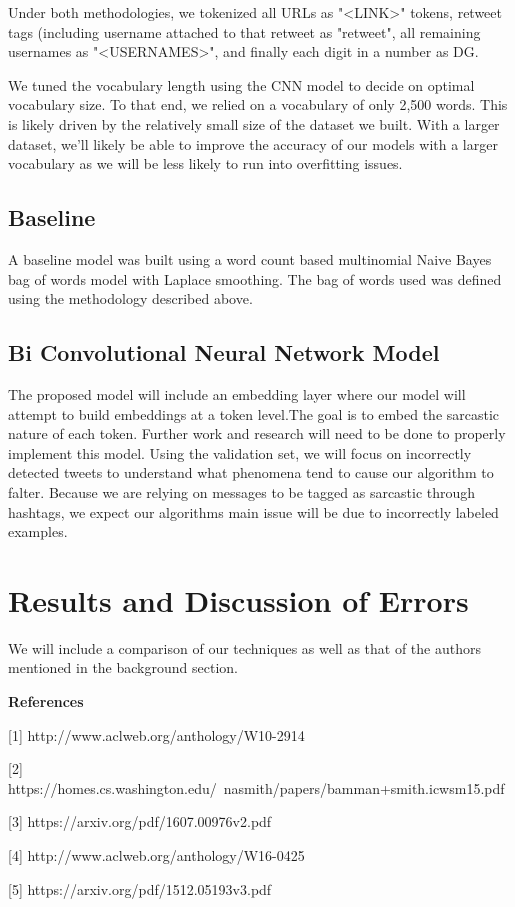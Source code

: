 \documentclass[11pt,a4paper]{article}
\begin{document}
Under both methodologies, we tokenized all URLs as "<LINK>" tokens, retweet tags (including username attached to that retweet as "retweet", all remaining usernames as "<USERNAMES>", and finally each digit in a number as DG. 

We tuned the vocabulary length using the CNN model to decide on optimal vocabulary size. To that end, we relied on a vocabulary of only 2,500 words. This is likely driven by the relatively small size of the dataset we built. With a larger dataset, we'll likely be able to improve the accuracy of our models with a larger vocabulary as we will be less likely to run into overfitting issues.

\subsection{Baseline}
A baseline model was built using a word count based multinomial Naive Bayes bag of words model with Laplace smoothing. The bag of words used was defined using the methodology described above. 

\subsection{Bi Convolutional Neural Network Model}
The proposed model will include an embedding layer where our model will attempt to build embeddings at a token level.The goal is to embed the sarcastic nature of each token. Further work and research will need to be done to properly implement this model. Using the validation set, we will focus on incorrectly detected tweets to understand what phenomena tend to cause our algorithm to falter. Because we are relying on messages to be tagged as sarcastic through hashtags, we expect our algorithms main issue will be due to incorrectly labeled examples.  

\section{Results and Discussion of Errors}



We will include a comparison of our techniques as well as that of the authors mentioned in the background section.

\textbf{References}

[1] http://www.aclweb.org/anthology/W10-2914

[2] https://homes.cs.washington.edu/~nasmith/papers/bamman+smith.icwsm15.pdf

[3] https://arxiv.org/pdf/1607.00976v2.pdf

[4] http://www.aclweb.org/anthology/W16-0425

[5] https://arxiv.org/pdf/1512.05193v3.pdf
\end{document}

